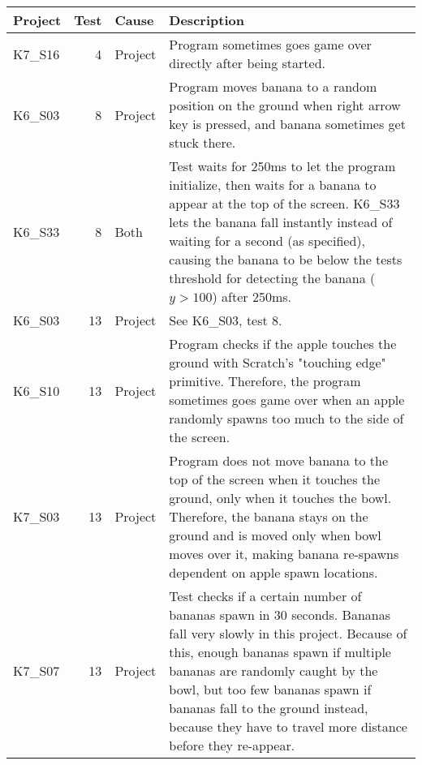 \begin{table}[htpb]
    \centering
    \tiny
    \begin{tabular}{lrlp{10.5cm}}
        \toprule
        Project & Test & Cause   & Description \\
        \midrule
        K7\_S16 & 4    & Project & Program sometimes goes game over directly after being started. \\

        K6\_S03 & 8    & Project & Program moves banana to a random position on the ground when right arrow key is pressed, and banana sometimes get stuck there. \\
        K6\_S33 & 8    & Both    & Test waits for 250ms to let the program initialize, then waits for a banana to appear at the top of the screen.
                                   K6\_S33 lets the banana fall instantly instead of waiting for a second (as specified),
                                   causing the banana to be below the tests threshold for detecting the banana ($y > 100$) after 250ms. \\

        K6\_S03 & 13   & Project & See K6\_S03, test 8. \\
        K6\_S10 & 13   & Project & Program checks if the apple touches the ground with Scratch's "touching edge" primitive.
                                   Therefore, the program sometimes goes game over when an apple randomly spawns too much to the side of the screen. \\
        K7\_S03 & 13   & Project & Program does not move banana to the top of the screen when it touches the ground, only when it touches the bowl.
                                   Therefore, the banana stays on the ground and is moved only when bowl moves over it, making banana re-spawns dependent on apple spawn locations. \\
        K7\_S07 & 13   & Project & Test checks if a certain number of bananas spawn in 30 seconds.
                                   Bananas fall very slowly in this project.
                                   Because of this, enough bananas spawn if multiple bananas are randomly caught by the bowl,
                                   but too few bananas spawn if bananas fall to the ground instead, because they have to travel more distance before they re-appear. \\


\end{tabular}
\end{table}
